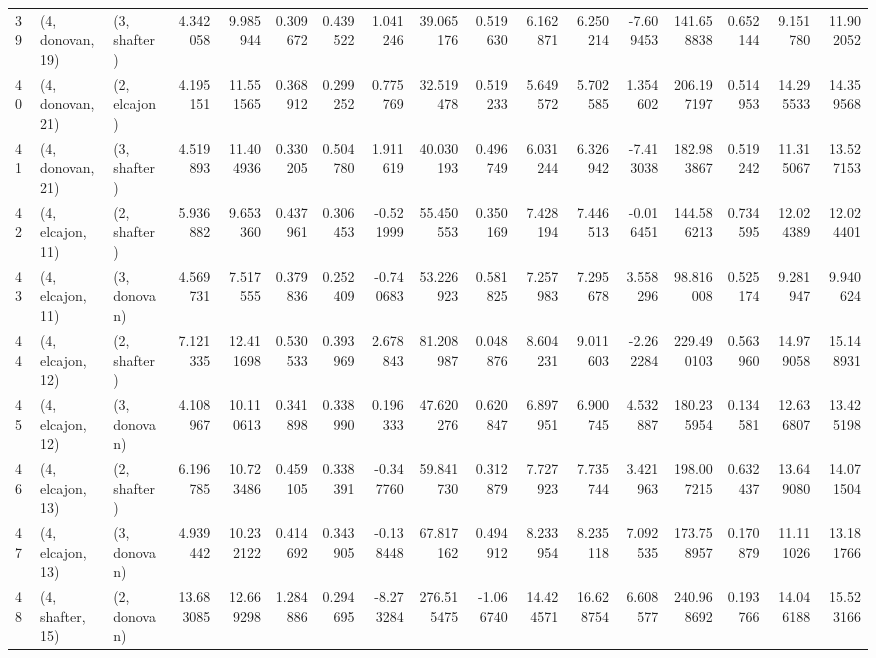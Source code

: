 \begin{tabular}{lllrrrrrrrrrrrrrr}
39 &  (4, donovan, 19) &     (3, shafter) &   4.342058 &   9.985944 &   0.309672 &  0.439522 &  1.041246 &    39.065176 &   0.519630 &   6.162871 &   6.250214 &  -7.609453 &  141.658838 &  0.652144 &   9.151780 &  11.902052 \\
40 &  (4, donovan, 21) &     (2, elcajon) &   4.195151 &  11.551565 &   0.368912 &  0.299252 &  0.775769 &    32.519478 &   0.519233 &   5.649572 &   5.702585 &   1.354602 &  206.197197 &  0.514953 &  14.295533 &  14.359568 \\
41 &  (4, donovan, 21) &     (3, shafter) &   4.519893 &  11.404936 &   0.330205 &  0.504780 &  1.911619 &    40.030193 &   0.496749 &   6.031244 &   6.326942 &  -7.413038 &  182.983867 &  0.519242 &  11.315067 &  13.527153 \\
42 &  (4, elcajon, 11) &     (2, shafter) &   5.936882 &   9.653360 &   0.437961 &  0.306453 & -0.521999 &    55.450553 &   0.350169 &   7.428194 &   7.446513 &  -0.016451 &  144.586213 &  0.734595 &  12.024389 &  12.024401 \\
43 &  (4, elcajon, 11) &     (3, donovan) &   4.569731 &   7.517555 &   0.379836 &  0.252409 & -0.740683 &    53.226923 &   0.581825 &   7.257983 &   7.295678 &   3.558296 &   98.816008 &  0.525174 &   9.281947 &   9.940624 \\
44 &  (4, elcajon, 12) &     (2, shafter) &   7.121335 &  12.411698 &   0.530533 &  0.393969 &  2.678843 &    81.208987 &   0.048876 &   8.604231 &   9.011603 &  -2.262284 &  229.490103 &  0.563960 &  14.979058 &  15.148931 \\
45 &  (4, elcajon, 12) &     (3, donovan) &   4.108967 &  10.110613 &   0.341898 &  0.338990 &  0.196333 &    47.620276 &   0.620847 &   6.897951 &   6.900745 &   4.532887 &  180.235954 &  0.134581 &  12.636807 &  13.425198 \\
46 &  (4, elcajon, 13) &     (2, shafter) &   6.196785 &  10.723486 &   0.459105 &  0.338391 & -0.347760 &    59.841730 &   0.312879 &   7.727923 &   7.735744 &   3.421963 &  198.007215 &  0.632437 &  13.649080 &  14.071504 \\
47 &  (4, elcajon, 13) &     (3, donovan) &   4.939442 &  10.232122 &   0.414692 &  0.343905 & -0.138448 &    67.817162 &   0.494912 &   8.233954 &   8.235118 &   7.092535 &  173.758957 &  0.170879 &  11.111026 &  13.181766 \\
48 &  (4, shafter, 15) &     (2, donovan) &  13.683085 &  12.669298 &   1.284886 &  0.294695 & -8.273284 &   276.515475 &  -1.066740 &  14.424571 &  16.628754 &   6.608577 &  240.968692 &  0.193766 &  14.046188 &  15.523166 \\

\end{tabular}

